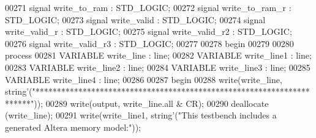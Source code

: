 \begin{DoxyCode}
00271                 \textcolor{keywordflow}{signal} \textcolor{vhdlchar}{write_to_ram} \textcolor{vhdlchar}{:}  \textcolor{comment}{STD\_LOGIC};
00272                 \textcolor{keywordflow}{signal} \textcolor{vhdlchar}{write_to_ram_r} \textcolor{vhdlchar}{:}  \textcolor{comment}{STD\_LOGIC};
00273                 \textcolor{keywordflow}{signal} \textcolor{vhdlchar}{write_valid} \textcolor{vhdlchar}{:}  \textcolor{comment}{STD\_LOGIC};
00274                 \textcolor{keywordflow}{signal} \textcolor{vhdlchar}{write_valid_r} \textcolor{vhdlchar}{:}  \textcolor{comment}{STD\_LOGIC};
00275                 \textcolor{keywordflow}{signal} \textcolor{vhdlchar}{write_valid_r2} \textcolor{vhdlchar}{:}  \textcolor{comment}{STD\_LOGIC};
00276                 \textcolor{keywordflow}{signal} \textcolor{vhdlchar}{write_valid_r3} \textcolor{vhdlchar}{:}  \textcolor{comment}{STD\_LOGIC};
00277 
00278 \textcolor{vhdlkeyword}{begin}
00279 
00280   \textcolor{keywordflow}{process}
00281 \textcolor{keywordflow}{VARIABLE} \textcolor{vhdlchar}{write\_line} \textcolor{vhdlchar}{:} \textcolor{vhdlchar}{line};
00282 \textcolor{keywordflow}{VARIABLE} \textcolor{vhdlchar}{write\_line1} \textcolor{vhdlchar}{:} \textcolor{vhdlchar}{line};
00283 \textcolor{keywordflow}{VARIABLE} \textcolor{vhdlchar}{write\_line2} \textcolor{vhdlchar}{:} \textcolor{vhdlchar}{line};
00284 \textcolor{keywordflow}{VARIABLE} \textcolor{vhdlchar}{write\_line3} \textcolor{vhdlchar}{:} \textcolor{vhdlchar}{line};
00285 \textcolor{keywordflow}{VARIABLE} \textcolor{vhdlchar}{write\_line4} \textcolor{vhdlchar}{:} \textcolor{vhdlchar}{line};
00286 
00287 \textcolor{vhdlkeyword}{    begin}
00288       \textcolor{vhdlchar}{write}\textcolor{vhdlchar}{(}\textcolor{vhdlchar}{write\_line}\textcolor{vhdlchar}{,} \textcolor{comment}{string}\textcolor{vhdlchar}{'}\textcolor{vhdlchar}{(}\textcolor{keyword}{"**********************************************************************"}\textcolor{vhdlchar}{)}\textcolor{vhdlchar}{)};
00289       \textcolor{vhdlchar}{write}\textcolor{vhdlchar}{(}\textcolor{vhdlchar}{output}\textcolor{vhdlchar}{,} \textcolor{vhdlchar}{write\_line}\textcolor{vhdlchar}{.}\textcolor{keywordflow}{all} \textcolor{vhdlchar}{&} \textcolor{vhdlchar}{CR}\textcolor{vhdlchar}{)};
00290       \textcolor{vhdlchar}{deallocate} \textcolor{vhdlchar}{(}\textcolor{vhdlchar}{write\_line}\textcolor{vhdlchar}{)};
00291       \textcolor{vhdlchar}{write}\textcolor{vhdlchar}{(}\textcolor{vhdlchar}{write\_line1}\textcolor{vhdlchar}{,} \textcolor{comment}{string}\textcolor{vhdlchar}{'}\textcolor{vhdlchar}{(}\textcolor{keyword}{"This testbench includes a generated Altera memory model:"}\textcolor{vhdlchar}{)}\textcolor{vhdlchar}{)};

\end{DoxyCode}
